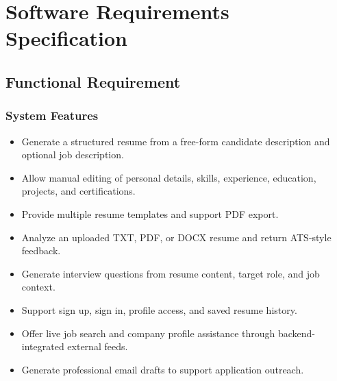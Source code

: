 \section{Software Requirements Specification}
\subsection{Functional Requirement}
\subsubsection{System Features}
\begin{itemize}
\item Generate a structured resume from a free-form candidate description and optional job description.
\item Allow manual editing of personal details, skills, experience, education, projects, and certifications.
\item Provide multiple resume templates and support PDF export.
\item Analyze an uploaded TXT, PDF, or DOCX resume and return ATS-style feedback.
\item Generate interview questions from resume content, target role, and job context.
\item Support sign up, sign in, profile access, and saved resume history.
\item Offer live job search and company profile assistance through backend-integrated external feeds.
\item Generate professional email drafts to support application outreach.
\end{itemize}

